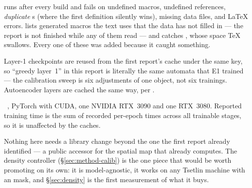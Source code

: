   runs after every build and fails on undefined macros,
undefined references, \emph{duplicate} s (where the first
definition silently wins), missing data files, and LaTeX errors.  lists
generated macros the text uses that the data has not filled in --- the report is not finished
while any of them read  --- and  catches
, whose space TeX swallows. Every one of these was added
because it caught something.

 Layer-1 checkpoints are reused from the first report's 
cache under the same key, so ``greedy layer~1'' in this report is literally the same automata
that E1 trained --- the calibration sweep is six adjustments of one object, not six trainings.
Autoencoder layers are cached the same way, per .

 \ttlibname\ \ttversionreport, PyTorch with CUDA, one NVIDIA RTX~3090 and
one RTX~3080. Reported training time is the sum of recorded per-epoch times across all
trainable stages, so it is unaffected by the caches.

 Nothing here needs a library change beyond the one the first report
already identified --- a public accessor for the spatial map that
 already computes. The density controller
(\S\ref{sec:method-calib}) is the one piece that would be worth promoting on its own: it is
model-agnostic, it works on any Tsetlin machine with an  mask, and
\S\ref{sec:density} is the first measurement of what it buys.
